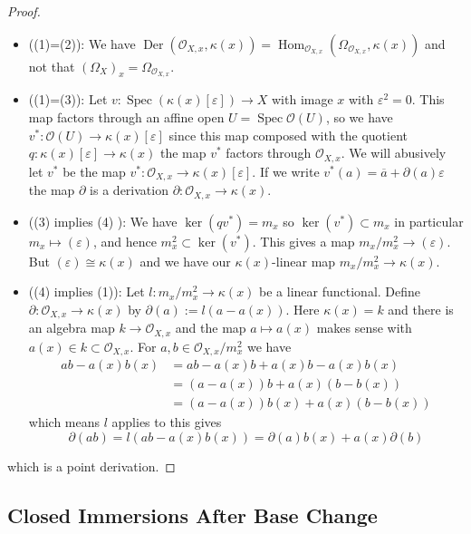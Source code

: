 \documentclass[12pt]{article}
\numberwithin{equation}{section}
\theoremstyle{definition}
\theoremstyle{remark}
\newcommand{\Hom}{\operatorname{Hom}}
\newcommand{\Ocal}{\mathcal{O}}
\newcommand{\Spec}{\operatorname{Spec}}
\newcommand{\Der}{\operatorname{Der}}
\begin{document}
\begin{proof}
	\begin{itemize}
		\item ((1)=(2)): We have $\Der(\Ocal_{X,x},\kappa(x))=\Hom_{\Ocal_{X,x}}(\Omega_{\Ocal_{X,x}},\kappa(x))$ and not that $(\Omega_X)_x = \Omega_{\Ocal_{X,x}}$.
		\item ((1)=(3)): Let $v: \Spec(\kappa(x)[\varepsilon]) \to X$ with image $x$ with $\varepsilon^2=0$.
		This map factors through an affine open $U = \Spec\Ocal(U)$, so we have $v^*:\Ocal(U)\to \kappa(x)[\varepsilon]$ since this map composed with the quotient $q:\kappa(x)[\varepsilon] \to \kappa(x)$ the map $v^*$ factors through $\Ocal_{X,x}$. 
		We will abusively let $v^*$ be the map $v^*:\Ocal_{X,x}\to \kappa(x)[\varepsilon]$.
		If we write $v^*(a) = \overline{a} + \partial(a)\varepsilon$ the map $\partial$ is a derivation $\partial:\Ocal_{X,x} \to \kappa(x)$.
		\item ((3) implies (4) ): We have $\ker(qv^*)=m_x$ so $\ker(v^*) \subset m_x$ in particular $m_x\mapsto (\varepsilon)$, and hence $m_x^2 \subset \ker(v^*)$. 
		This gives a map $m_x/m_x^2 \to (\varepsilon)$. 
		But $(\varepsilon) \cong  \kappa(x)$ and we have our $\kappa(x)$-linear map $m_x/m_x^2 \to \kappa(x)$.
		\item ((4) implies (1)): Let $l:m_x/m_x^2\to \kappa(x)$ be a linear functional. Define $\partial: \Ocal_{X,x} \to \kappa(x)$ by $\partial(a) := l(a-a(x))$.
		Here $\kappa(x)=k$ and there is an algebra map $k\to \Ocal_{X,x}$ and the map $a\mapsto a(x)$ makes sense with $a(x)\in k\subset \Ocal_{X,x}$.
		For $a,b\in \Ocal_{X,x}/m_x^2$ we have 
		\begin{align*}
		ab-a(x)b(x) &= ab-a(x)b+a(x)b-a(x)b(x) \\
		&= (a-a(x))b+a(x)(b-b(x)) \\
		&= (a-a(x))b(x) + a(x)(b-b(x)) 
		\end{align*}
		which means $l$ applies to this gives 
		 $$\partial(ab)= l(ab-a(x)b(x) ) = \partial(a)b(x) + a(x) \partial(b)$$
	\end{itemize}
     which is a point derivation.
\end{proof}



\subsection{Closed Immersions After Base Change}
\end{document}
